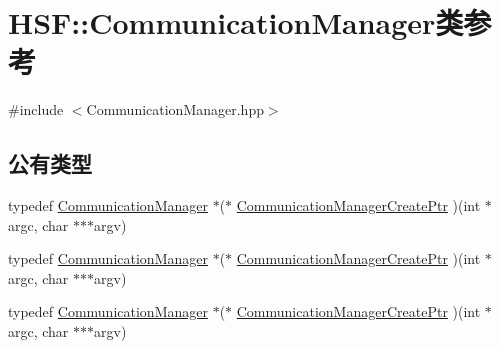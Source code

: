 \hypertarget{classHSF_1_1CommunicationManager}{
\section{HSF::CommunicationManager类参考}
\label{classHSF_1_1CommunicationManager}
}


{\ttfamily \#include $<$CommunicationManager.hpp$>$}\subsection*{公有类型}
\begin{DoxyCompactItemize}
\item 
typedef \hyperlink{classHSF_1_1CommunicationManager}{CommunicationManager} $\ast$($\ast$ \hyperlink{classHSF_1_1CommunicationManager_a11ce3f8f0c5cf854ecc7a77313c7ae2d}{CommunicationManagerCreatePtr} )(int $\ast$argc, char $\ast$$\ast$$\ast$argv)
\item 
typedef \hyperlink{classHSF_1_1CommunicationManager}{CommunicationManager} $\ast$($\ast$ \hyperlink{classHSF_1_1CommunicationManager_a11ce3f8f0c5cf854ecc7a77313c7ae2d}{CommunicationManagerCreatePtr} )(int $\ast$argc, char $\ast$$\ast$$\ast$argv)
\item 
typedef \hyperlink{classHSF_1_1CommunicationManager}{CommunicationManager} $\ast$($\ast$ \hyperlink{classHSF_1_1CommunicationManager_a11ce3f8f0c5cf854ecc7a77313c7ae2d}{CommunicationManagerCreatePtr} )(int $\ast$argc, char $\ast$$\ast$$\ast$argv)
\end{DoxyCompactItemize}
